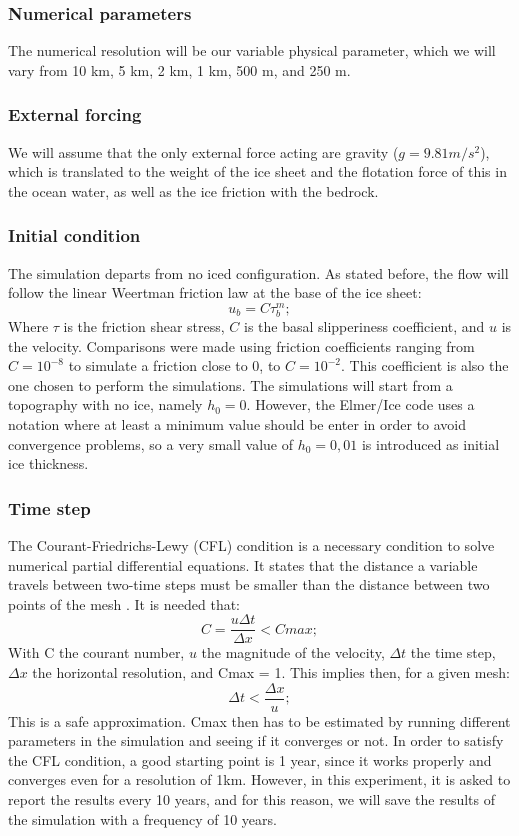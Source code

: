 \documentclass{article}
\begin{document}
\subsubsection{Numerical parameters}
The numerical resolution will be our variable physical parameter, which we will vary from 10 km, 5 km, 2 km, 1 km, 500 m, and 250 m. 
\subsubsection{External forcing}
We will assume that the only external force acting are gravity ($g=9.81 m/s^2$), which is translated to the weight of the ice sheet and the flotation force of this in the ocean water, as well as the ice friction with the bedrock.
\subsubsection{Initial condition}
The simulation departs from no iced configuration. 
As stated before, the flow will follow the linear Weertman friction law at the base of the ice sheet:
\begin{equation}
	u_b=C\tau_b^m;
\end{equation}
Where $\tau$ is the friction shear stress, $C$ is the basal slipperiness coefficient, and $u$ is the velocity.
Comparisons were made using friction coefficients ranging from $C=10^{-8}$ to simulate a friction close to 0, to $C=10^{-2}$. This coefficient is also the one chosen to perform the simulations.
The simulations will start from a topography with no ice, namely $h_0 = 0$. However, the Elmer/Ice code uses a notation where at least a minimum value should be enter in order to avoid convergence problems, so a very small value of $h_0 = 0,01$ is introduced as initial ice thickness. 
\subsubsection{Time step}
The Courant-Friedrichs-Lewy (CFL) condition is a necessary condition to solve numerical partial differential equations. It states that the distance a variable travels between two-time steps must be smaller than the distance between two points of the mesh \cite[]{courant1967partial}. It is needed that:
\begin{equation}
	C=\frac{u\Delta t}{\Delta x}<Cmax;
\end{equation}
With C the courant number, $u$ the magnitude of the velocity, $\Delta t$ the time step, $\Delta x$ the horizontal resolution, and Cmax = 1. This implies then, for a given mesh:
\begin{equation}
	\Delta t < \frac{\Delta x}{u};
\end{equation}
This is a safe approximation. Cmax then has to be estimated by running different parameters in the simulation and seeing if it converges or not. In order to satisfy the CFL condition, a good starting point is 1 year, since it works properly and converges even for a resolution of 1km.
However, in this experiment, it is asked to report the results every 10 years, and for this reason, we will save the results of the simulation with a frequency of 10 years. 
\end{document}
